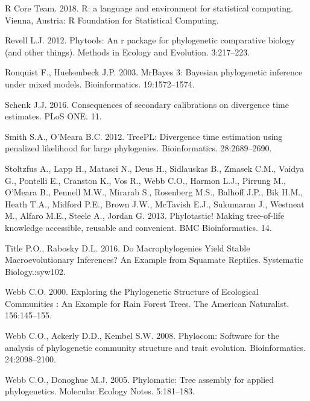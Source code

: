 \documentclass[]{article}
\begin{document}
\leavevmode\hypertarget{ref-RCoreTeam2018}{}%
R Core Team. 2018. R: a language and environment for statistical computing. Vienna, Austria: R Foundation for Statistical Computing.

\leavevmode\hypertarget{ref-Revell2012}{}%
Revell L.J. 2012. Phytools: An r package for phylogenetic comparative biology (and other things). Methods in Ecology and Evolution. 3:217--223.

\leavevmode\hypertarget{ref-Ronquist2003}{}%
Ronquist F., Huelsenbeck J.P. 2003. MrBayes 3: Bayesian phylogenetic inference under mixed models. Bioinformatics. 19:1572--1574.

\leavevmode\hypertarget{ref-Schenk2016}{}%
Schenk J.J. 2016. Consequences of secondary calibrations on divergence time estimates. PLoS ONE. 11.

\leavevmode\hypertarget{ref-Smith2012}{}%
Smith S.A., O'Meara B.C. 2012. TreePL: Divergence time estimation using penalized likelihood for large phylogenies. Bioinformatics. 28:2689--2690.

\leavevmode\hypertarget{ref-Stoltzfus2013}{}%
Stoltzfus A., Lapp H., Matasci N., Deus H., Sidlauskas B., Zmasek C.M., Vaidya G., Pontelli E., Cranston K., Vos R., Webb C.O., Harmon L.J., Pirrung M., O'Meara B., Pennell M.W., Mirarab S., Rosenberg M.S., Balhoff J.P., Bik H.M., Heath T.A., Midford P.E., Brown J.W., McTavish E.J., Sukumaran J., Westneat M., Alfaro M.E., Steele A., Jordan G. 2013. Phylotastic! Making tree-of-life knowledge accessible, reusable and convenient. BMC Bioinformatics. 14.

\leavevmode\hypertarget{ref-title2016macrophylogenies}{}%
Title P.O., Rabosky D.L. 2016. Do Macrophylogenies Yield Stable Macroevolutionary Inferences? An Example from Squamate Reptiles. Systematic Biology.:syw102.

\leavevmode\hypertarget{ref-Webb2000}{}%
Webb C.O. 2000. Exploring the Phylogenetic Structure of Ecological Communities : An Example for Rain Forest Trees. The American Naturalist. 156:145--155.

\leavevmode\hypertarget{ref-Webb2008}{}%
Webb C.O., Ackerly D.D., Kembel S.W. 2008. Phylocom: Software for the analysis of phylogenetic community structure and trait evolution. Bioinformatics. 24:2098--2100.

\leavevmode\hypertarget{ref-webb2005phylomatic}{}%
Webb C.O., Donoghue M.J. 2005. Phylomatic: Tree assembly for applied phylogenetics. Molecular Ecology Notes. 5:181--183.

\newpage
\end{document}
